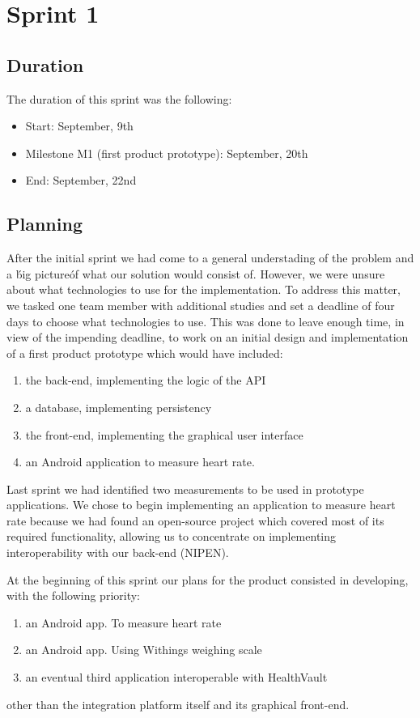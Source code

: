 
\chapter{Sprint 1}
\label{Sprint1}

\section{Duration}
The duration of this sprint was the following:
\begin{itemize}
\item Start: September, 9th
\item Milestone M1 (first product prototype): September, 20th
\item End: September, 22nd
\end{itemize}

\section{Planning}

After the initial sprint we had come to a general understading of the problem and a \'big picture\' of what our solution would consist of. 
However, we were unsure about what technologies to use for the implementation. 
To address this matter, we tasked one team member with additional studies and set a deadline of four days to choose what technologies to use.
This was done to leave enough time, in view of the impending deadline, to work on an initial design and implementation of a first product prototype which would have included:
\begin{enumerate}
\item the back-end, implementing the logic of the API
\item a database, implementing persistency
\item the front-end, implementing the graphical user interface
\item an Android application to measure heart rate.
\end{enumerate}

Last sprint we had identified two measurements to be used in prototype applications.
We chose to begin implementing an application to measure heart rate because we had found an open-source project which covered most of its required functionality, allowing us to concentrate on implementing interoperability with our back-end (NIPEN).

At the beginning of this sprint our plans for the product consisted in developing, with the following priority:
\begin{enumerate}[1.]
\item an Android app. To measure heart rate
\item an Android app. Using Withings weighing scale
\item an eventual third application interoperable with HealthVault
\end{enumerate}
other than the integration platform itself and its graphical front-end.

